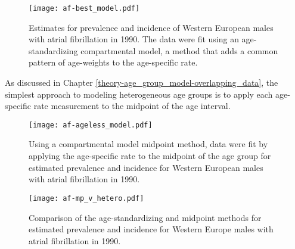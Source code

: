     \begin{figure}[h]
        \begin{center}
            \texttt{[image: af-best\_model.pdf]}
            \caption{Estimates for prevalence and incidence of Western European males with atrial fibrillation in 1990.  The data were fit using an age-standardizing compartmental model, a method that adds a common pattern of age-weights to the age-specific rate.}
            \label{fig:app-af age-stand}
        \end{center}
    \end{figure}

As discussed in Chapter \ref{theory-age_group_model-overlapping_data}, the simplest approach to modeling heterogeneous age groups is to apply each age-specific rate measurement to the midpoint of the age interval.

    \begin{figure}[h]
        \begin{center}
            \texttt{[image: af-ageless\_model.pdf]}
            \caption{Using a compartmental model midpoint method, data were fit by applying the age-specific rate to the midpoint of the age group for estimated prevalence and incidence for Western European males with atrial fibrillation in 1990.}
            \label{fig:app-af mp}
        \end{center}
    \end{figure}

    \begin{figure}[h]
        \begin{center}
            \texttt{[image: af-mp\_v\_hetero.pdf]}
            \caption{Comparison of the age-standardizing and midpoint methods for estimated prevalence and incidence for Western Europe males with atrial fibrillation in 1990.}
            \label{fig:app-af mp}
        \end{center}
    \end{figure}

